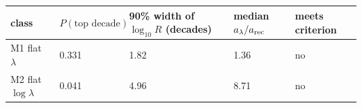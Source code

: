 \begin{longtable}[]{@{}lllll@{}}
\toprule
\begin{minipage}[b]{0.22\columnwidth}\raggedright
class\strut
\end{minipage} & \begin{minipage}[b]{0.15\columnwidth}\raggedright
\(P(\text{top decade})\)\strut
\end{minipage} & \begin{minipage}[b]{0.17\columnwidth}\raggedright
90\% width of \(\log_{10}R\) (decades)\strut
\end{minipage} & \begin{minipage}[b]{0.18\columnwidth}\raggedright
median \(a_\lambda/a_{\rm rec}\)\strut
\end{minipage} & \begin{minipage}[b]{0.13\columnwidth}\raggedright
meets criterion\strut
\end{minipage}\tabularnewline
\midrule
\endhead
\begin{minipage}[t]{0.22\columnwidth}\raggedright
M1 flat \(\lambda\)\strut
\end{minipage} & \begin{minipage}[t]{0.15\columnwidth}\raggedright
0.331\strut
\end{minipage} & \begin{minipage}[t]{0.17\columnwidth}\raggedright
1.82\strut
\end{minipage} & \begin{minipage}[t]{0.18\columnwidth}\raggedright
1.36\strut
\end{minipage} & \begin{minipage}[t]{0.13\columnwidth}\raggedright
no\strut
\end{minipage}\tabularnewline
\begin{minipage}[t]{0.22\columnwidth}\raggedright
M2 flat \(\log\lambda\)\strut
\end{minipage} & \begin{minipage}[t]{0.15\columnwidth}\raggedright
0.041\strut
\end{minipage} & \begin{minipage}[t]{0.17\columnwidth}\raggedright
4.96\strut
\end{minipage} & \begin{minipage}[t]{0.18\columnwidth}\raggedright
8.71\strut
\end{minipage} & \begin{minipage}[t]{0.13\columnwidth}\raggedright
no\strut
\end{minipage}\tabularnewline

\end{longtable}
